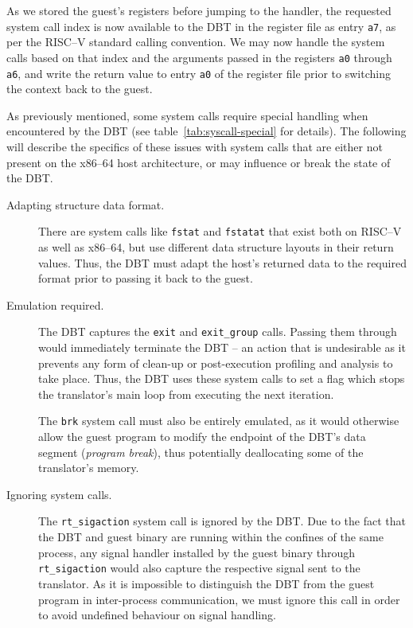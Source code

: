 As we stored the guest's registers before jumping to the handler, the requested system call index is now available to the DBT in the register file as entry \texttt{a7}, as per the RISC--V standard calling convention.
We may now handle the system calls based on that index and the arguments passed in the registers \texttt{a0} through \texttt{a6}, and write the return value to entry \texttt{a0} of the register file prior to switching the context back to the guest.

As previously mentioned, some system calls require special handling when encountered by the DBT (see table~\vref{tab:syscall-special} for details).
The following will describe the specifics of these issues with system calls that are either not present on the x86--64 host architecture, or may influence or break the state of the DBT\@.
\begin{description}
	\item[Adapting structure data format.]
	There are system calls like \texttt{fstat} and \texttt{fstatat} that exist both on RISC--V as well as x86--64, but use different data structure layouts in their return values.
	Thus, the DBT must adapt the host's returned data to the required format prior to passing it back to the guest.
	
	
	\item[Emulation required.]
	The DBT captures the \texttt{exit} and \texttt{exit\_group} calls.
	Passing them through would immediately terminate the DBT -- an action that is undesirable as it prevents any form of clean-up or post-execution profiling and analysis to take place.
	Thus, the DBT uses these system calls to set a flag which stops the translator's main loop from executing the next iteration.
	
	The \texttt{brk} system call must also be entirely emulated, as it would otherwise allow the guest program to modify the endpoint of the DBT's data segment (\textit{program break}), thus potentially deallocating some of the translator's memory.
	
	
	\item[Ignoring system calls.]
	The \texttt{rt\_sigaction} system call is ignored by the DBT.
	Due to the fact that the DBT and guest binary are running within the confines of the same process, any signal handler installed by the guest binary through \texttt{rt\_sigaction} would also capture the respective signal sent to the translator.
	As it is impossible to distinguish the DBT from the guest program in inter-process communication, we must ignore this call in order to avoid undefined behaviour on signal handling.
	

\end{description}
